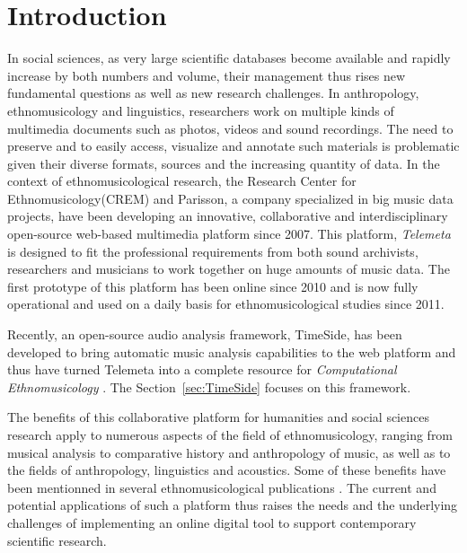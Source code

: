 \documentclass{sig-alternate}
\newcommand{\CREM}{Research Center for Ethnomusicology}
\begin{document}
\section{Introduction}\label{sec:intro}
In social sciences, as very large scientific databases become available and rapidly increase by both numbers and volume, their management thus rises new fundamental questions as well as new research challenges. 
In anthropology, ethnomusicology and linguistics, researchers work on multiple kinds of multimedia documents such as photos, videos and sound recordings. The need to preserve and to easily access, visualize and annotate such materials is problematic given their diverse formats, sources and the increasing quantity of data.
 In the context of ethnomusicological research, the \CREM (CREM) and Parisson, a company specialized in big music data projects, have been developing an innovative, collaborative and interdisciplinary open-source web-based multimedia platform since 2007. 
 This platform, \emph{Telemeta} is designed to fit the professional requirements from both sound archivists, researchers and musicians to work together on huge amounts of music data. The first prototype of this platform has been online since 2010 and is now fully operational and used on a daily basis for ethnomusicological studies since 2011. 

Recently, an open-source audio analysis framework, TimeSide, has been developed to bring automatic music analysis capabilities to the web platform and thus have turned Telemeta into a complete resource for \emph{Computational Ethnomusicology} \cite{Tzanetakis_2007_JIMS, Gomez_JNMR_2013}. The Section~\ref{sec:TimeSide} focuses on this framework.

The benefits of this collaborative platform for humanities and social sciences research apply to numerous aspects of the field of ethnomusicology, ranging from musical analysis to comparative history and anthropology of music, as well as to the fields of anthropology, linguistics and acoustics. Some of these benefits have been mentionned in several ethnomusicological publications \cite{Simmonot_IASA_2011, Julien_IASA_2011, Simonnot_ICTM_2014}.
The current and potential applications of such a platform thus raises the needs and the underlying challenges of implementing an online digital tool to support contemporary scientific research.
\end{document}
